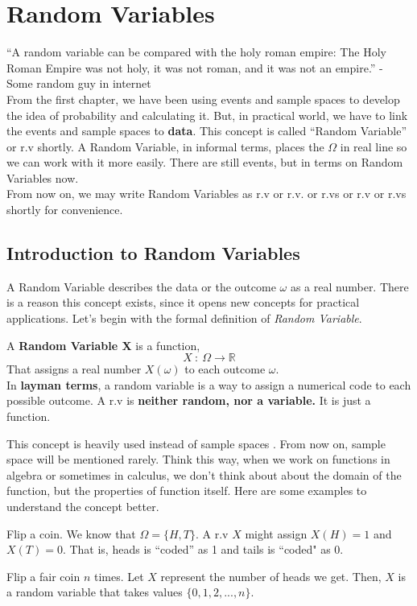 \chapter{Random Variables}
``A random variable can be compared with the holy roman empire: The Holy Roman Empire was not holy, it was not roman, and it was not an empire.'' - Some random guy in internet \\ 

From the first chapter, we have been using events and sample spaces to develop the idea of probability and calculating it. But, in practical world,  we have to link the events and sample spaces to \textbf{data}. This concept is called ``Random Variable'' or r.v shortly.
A Random Variable, in informal terms, places the $\Omega$ in real line so we can work with it more easily. There are still events, but in terms on Random Variables now.
\\From now on, we may write Random Variables as r.v or r.v. or r.vs or r.v or r.vs shortly for convenience.



\section{Introduction to Random Variables}

A Random Variable describes the data or the outcome $\omega$ as a real number. There is a reason this concept exists, since it opens new concepts for practical applications.
\newline
Let's begin with the formal definition of \textit{ Random Variable}.

\begin{definition}
    A \textbf{Random Variable X} is a function,
    $$ X \ : \ \Omega \rightarrow \mathbb{R}$$
    That assigns a real number $X(\omega)$ to each outcome $\omega$. \\
    In \textbf{layman terms}, a random variable is a way to assign a numerical code to each possible outcome. A r.v is \textbf{neither random, nor a variable.} It is just a function. 
\end{definition}

This concept is heavily used instead of sample spaces . From now on, sample space will be mentioned rarely. Think this way, when we work on functions in algebra or sometimes in calculus, we don't think about about the domain of the function, but the properties of function itself.
Here are some examples to understand the concept better.
\begin{example} Flip a coin. We know that $\Omega =\{H,T\}$. A r.v $X$ might assign $X(H) = 1$ and $X(T) = 0$. That is, heads is ``coded'' as 1 and tails is ``coded" as 0.
    
\end{example}
\begin{example}
    Flip a fair coin $n$ times. Let $X$ represent the number of heads we get. Then, $X$ is a random variable that takes values $\{0,1,2,...,n\}$.
\end{example}

